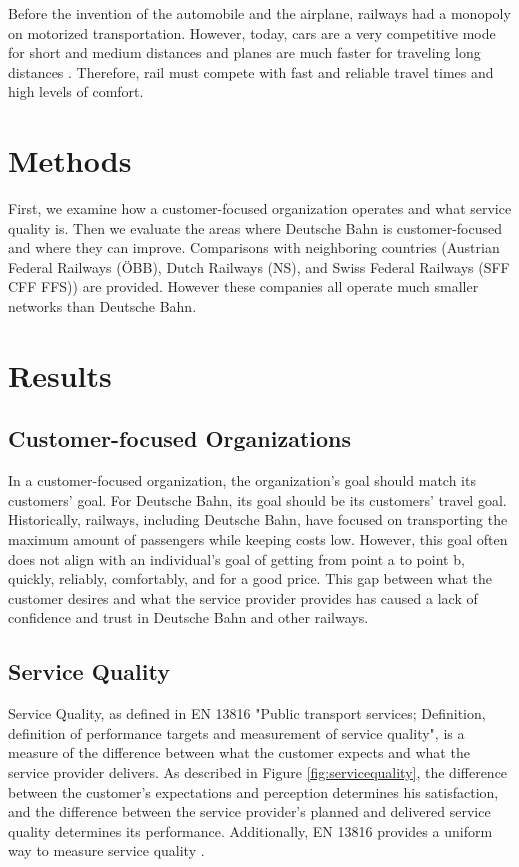 \documentclass{article}
\begin{document}
Before the invention of the automobile and the airplane, railways had a monopoly on motorized transportation. However, today, cars are a very competitive mode for short and medium distances and planes are much faster for traveling long distances \citep[Page 2]{laube2008}. Therefore, rail must compete with fast and reliable travel times and high levels of comfort.

\section{Methods}
First, we examine how a customer-focused organization operates and what service quality is. Then we evaluate the areas where Deutsche Bahn is customer-focused and where they can improve. Comparisons with neighboring countries (Austrian Federal Railways (ÖBB), Dutch Railways (NS), and Swiss Federal Railways (SFF CFF FFS)) are provided. However these companies all operate much smaller networks than Deutsche Bahn.

\section{Results}
\subsection{Customer-focused Organizations}
In a customer-focused organization, the organization's goal should match its customers' goal. For Deutsche Bahn, its goal should be its customers' travel goal. Historically, railways, including Deutsche Bahn, have focused on transporting the maximum amount of passengers while keeping costs low. However, this goal often does not align with an individual's goal of getting from point a to point b, quickly, reliably, comfortably, and for a good price. This gap between what the customer desires and what the service provider provides has caused a lack of confidence and trust in Deutsche Bahn and other railways.

\subsection{Service Quality}
Service Quality, as defined in EN 13816 "Public transport services; Definition, definition of performance targets and measurement of service quality", is a measure of the difference between what the customer expects and what the service provider delivers. As described in Figure \ref{fig:servicequality}, the difference between the customer's expectations and perception determines his satisfaction, and the difference between the service provider's planned and delivered service quality determines its performance. Additionally, EN 13816 provides a uniform way to measure service quality \citep{en13816}. 
\end{document}

